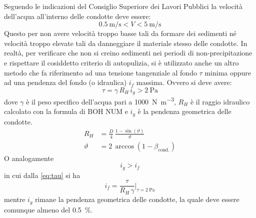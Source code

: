 Seguendo le indicazioni del Consiglio Superiore dei Lavori Pubblici la velocità dell'acqua all'interno delle condotte deve essere:
\begin{equation}
    \SI{0.5}{\metre\per\second} < V <  \SI{5}{\metre\per\second}
\end{equation}
Questo per non avere velocità troppo basse tali da formare dei sedimenti né velocità troppo elevate tali da danneggiare il materiale stesso delle condotte.
In realtà, per verificare che non si creino sedimenti nei periodi di non-precipitazione e rispettare il cosiddetto criterio di autopulizia, si è utilizzato anche un altro metodo che fa riferimento ad una tensione tangenziale al fondo $\tau$ minima oppure ad una pendenza del fondo (o idraulica) $i_f$ massima. 
Ovvero si deve avere:
\begin{equation}
    \label{eq:tau}
    \tau = \gamma \, R_H \, i_g > \SI{2}{\pascal}
\end{equation}
dove $\gamma$ è il peso specifico dell'acqua pari a \SI{1000}{\newton\per\metre\cubed}, $R_H$ è il raggio idraulico calcolato con la formula di BOH NUM e $i_g$ è la pendenza geometrica delle condotte.  
\begin{align}
    R_H &= \frac{D}{4} \, \frac{1 - \sin(\vartheta)}{\vartheta} \\
    \vartheta &= 2 \, \arccos(1 - \beta_\text{cond.})
\end{align}
O analogamente
\begin{equation}
    i_g > i_f  
\end{equation}
in cui dalla \ref{eq:tau} si ha 
\begin{equation}
    i_f = \frac{\tau}{R_H \, \gamma} \biggr|_{\tau=\SI{2}{\pascal}}
\end{equation}    
mentre $i_g$ rimane la pendenza geometrica delle condotte, la quale deve essere comunque almeno del \SI{0.5}{\percent}.






